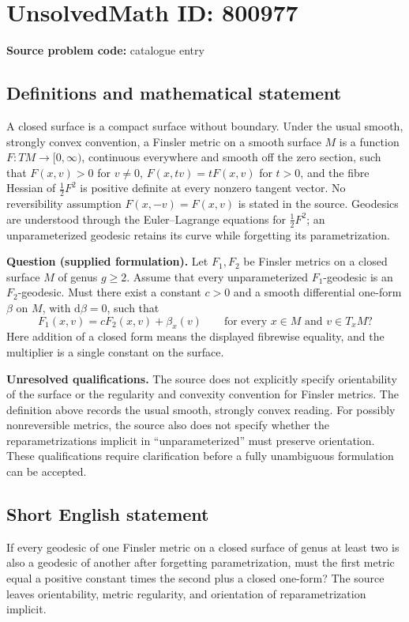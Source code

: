 \documentclass[11pt]{article}
\begin{document}
\section*{UnsolvedMath ID: 800977}
\textbf{Source problem code:} catalogue entry
\subsection{Definitions and mathematical statement}
A closed surface is a compact surface without boundary. Under the usual smooth, strongly convex convention, a Finsler metric on a smooth surface \(M\) is a function \(F:TM\to[0,\infty)\), continuous everywhere and smooth off the zero section, such that \(F(x,v)>0\) for \(v\ne0\), \(F(x,tv)=tF(x,v)\) for \(t>0\), and the fibre Hessian of \(\tfrac12F^2\) is positive definite at every nonzero tangent vector. No reversibility assumption \(F(x,-v)=F(x,v)\) is stated in the source. Geodesics are understood through the Euler--Lagrange equations for \(\tfrac12F^2\); an unparameterized geodesic retains its curve while forgetting its parametrization.

\textbf{Question (supplied formulation).} Let \(F_1,F_2\) be Finsler metrics on a closed surface \(M\) of genus \(g\ge2\). Assume that every unparameterized \(F_1\)-geodesic is an \(F_2\)-geodesic. Must there exist a constant \(c>0\) and a smooth differential one-form \(\beta\) on \(M\), with \(\mathrm d\beta=0\), such that
\[
F_1(x,v)=cF_2(x,v)+\beta_x(v)
\qquad\text{for every }x\in M\text{ and }v\in T_xM?
\]
Here addition of a closed form means the displayed fibrewise equality, and the multiplier is a single constant on the surface.

\textbf{Unresolved qualifications.} The source does not explicitly specify orientability of the surface or the regularity and convexity convention for Finsler metrics. The definition above records the usual smooth, strongly convex reading. For possibly nonreversible metrics, the source also does not specify whether the reparametrizations implicit in ``unparameterized'' must preserve orientation. These qualifications require clarification before a fully unambiguous formulation can be accepted.
\subsection{Short English statement}
If every geodesic of one Finsler metric on a closed surface of genus at least two is also a geodesic of another after forgetting parametrization, must the first metric equal a positive constant times the second plus a closed one-form? The source leaves orientability, metric regularity, and orientation of reparametrization implicit.
\end{document}
